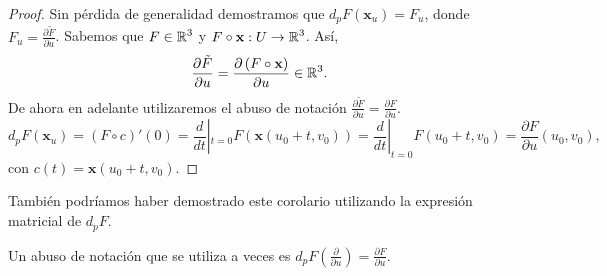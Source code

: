 \begin{proof}
	Sin pérdida de generalidad demostramos que $\displaystyle d _{p}F\left( \textbf{x} _{u}\right)=F_{u} $, donde $\displaystyle F_{u}=\frac{\partial \tilde{F}}{\partial u} $. 
Sabemos que $\displaystyle F \in \mathbb{R}^{3} $ y $\displaystyle F \circ \textbf{x}  : U \to \mathbb{R}^{3} $. Así, 
\[\frac{\partial \tilde{F}}{\partial u}=\frac{\partial \left(F\circ \textbf{x} \right)}{\partial u}\in \mathbb{R}^{3} .\]
De ahora en adelante utilizaremos el abuso de notación $\displaystyle \frac{\partial \tilde{F}}{\partial u}=\frac{\partial F}{\partial u} $.  
\[d _{p}F\left( \textbf{x} _{u}\right) = \left(F\circ c\right)'\left(0\right)=\frac{d}{dt}|_{t = 0}F\left( \textbf{x} \left(u_{0} + t, v_{0}\right)\right) = \frac{d}{dt}|_{t = 0}F\left(u_{0} + t, v_{0}\right) = \frac{\partial F}{ \partial u}\left(u_{0}, v_{0}\right) ,\]
con $\displaystyle c\left(t\right)= \textbf{x} \left(u_{0} + t, v_{0}\right) $.
\end{proof}
\begin{observation}
También podríamos haber demostrado este corolario utilizando la expresión matricial de $\displaystyle d _{p}F $.
\end{observation}

\begin{notation}
Un abuso de notación que se utiliza a veces es $\displaystyle d _{p}F\left(\frac{\partial }{\partial u}\right)=\frac{\partial F}{\partial u} $.
\end{notation}

